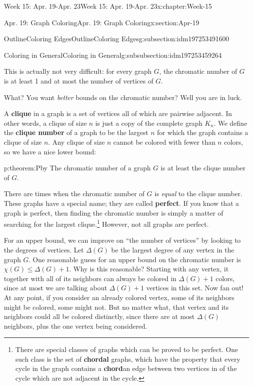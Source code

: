 \documentclass[oneside,10pt,]{book}
\newcommand{\terminology}[1]{\textbf{#1}}
\numberwithin{equation}{section}
\renewcommand{\le}{\leqslant}
\begin{document}
\begin{chapterptx}{Week 15: Apr. 19-Apr. 23}{}{Week 15: Apr. 19-Apr. 23}{}{}{x:chapter:Week-15}
\begin{sectionptx}{Apr. 19: Graph Coloring}{}{Apr. 19: Graph Coloring}{}{}{x:section:Apr-19}
\begin{subsectionptx}{OutlineColoring Edges}{}{OutlineColoring Edges}{}{}{g:subsection:idm197253491600}
\begin{subsubsectionptx}{Coloring in General}{}{Coloring in General}{}{}{g:subsubsection:idm197253459264}
\par
This is actually not very difficult: for every graph \(G\), the chromatic number of \(G\) is at least 1 and at most the number of vertices of \(G\).%
\par
What? You want \emph{better} bounds on the chromatic number? Well you are in luck.%
\par
{} A \terminology{clique} in a graph is a set of vertices all of which are pairwise adjacent. In other words, a clique of size \(n\) is just a copy of the complete graph \(K_n\). We define the \terminology{clique number} of a graph to be the largest \(n\) for which the graph contains a clique of size \(n\). Any clique of size \(n\) cannot be colored with fewer than \(n\) colors, so we have a nice lower bound:%
\begin{theorem}{}{}{p:theorem:Pby}%
The chromatic number of a graph \(G\) is at least the clique number of \(G\).%
\end{theorem}
 There are times when the chromatic number of \(G\) is \emph{equal} to the clique number. These graphs have a special name; they are called \terminology{perfect}. If you know that a graph is perfect, then finding the chromatic number is simply a matter of searching for the largest clique.\footnote{There are special classes of graphs which can be proved to be perfect. One such class is the set of \terminology{chordal} graphs, which have the property that every cycle in the graph contains a \terminology{chord}\textemdash{}an edge between two vertices in of the cycle which are not adjacent in the cycle.\label{g:fn:idm197253431504}} However, not all graphs are perfect.%
\par
{} For an upper bound, we can improve on ``the number of vertices'' by looking to the degrees of vertices. Let \(\Delta(G)\) \label{g:notation:idm197253426016} be the largest degree of any vertex in the graph \(G\). One reasonable guess for an upper bound on the chromatic number is \(\chi(G) \le \Delta(G) + 1\). Why is this reasonable? Starting with any vertex, it together with all of its neighbors can always be colored in \(\Delta(G) + 1\) colors, since at most we are talking about \(\Delta(G) + 1\) vertices in this set. Now fan out! At any point, if you consider an already colored vertex, some of its neighbors might be colored, some might not. But no matter what, that vertex and its neighbors could all be colored distinctly, since there are at most \(\Delta(G)\) neighbors, plus the one vertex being considered.%

\end{subsubsectionptx}
\end{subsectionptx}
\end{sectionptx}
\end{chapterptx}
\end{document}
